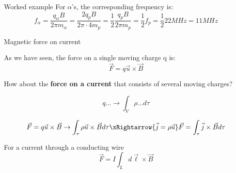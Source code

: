 {\begin{frame}{Worked example}
For $\alpha$'s, the corresponding frequency is:
\begin{equation*}
 f_{\alpha} = \frac{q_{\alpha} B}{2\pi m_{\alpha}} = \frac{2q_p B}{2\pi \cdot 4m_{p}} =  \frac{1}{2}  \frac{q_p B}{2\pi m_p}  =
   \frac{1}{2} f_{p} =  \frac{1}{2}  22 MHz = 11 MHz
\end{equation*}

\end{frame}


} %



%
%
%

\begin{frame}{Magnetic force on current}

As we have seen, the force on a single moving charge q is:
\begin{equation*}
  \vec{F} = q \vec{u} \times \vec{B}
\end{equation*}

How about the {\bf force on a current} that consists of several moving charges?

\begin{equation*}
  q ...  \rightarrow \int_{V} \rho ... d\tau
\end{equation*}

\begin{equation*}
  \vec{F} = q \vec{u} \times \vec{B} \rightarrow \int_{\tau} \rho \vec{u} \times \vec{B} d\tau
                 \xRightarrow {\vec{j} = \rho \vec{u}}
  \vec{F} = \int_{\tau} \vec{j} \times \vec{B} d\tau
\end{equation*}

For a current through a conducting wire
\begin{equation*}
  \vec{F} = I \int_{L} d\vec{\ell} \times \vec{B}
\end{equation*}

\end{frame}

%
%
%

